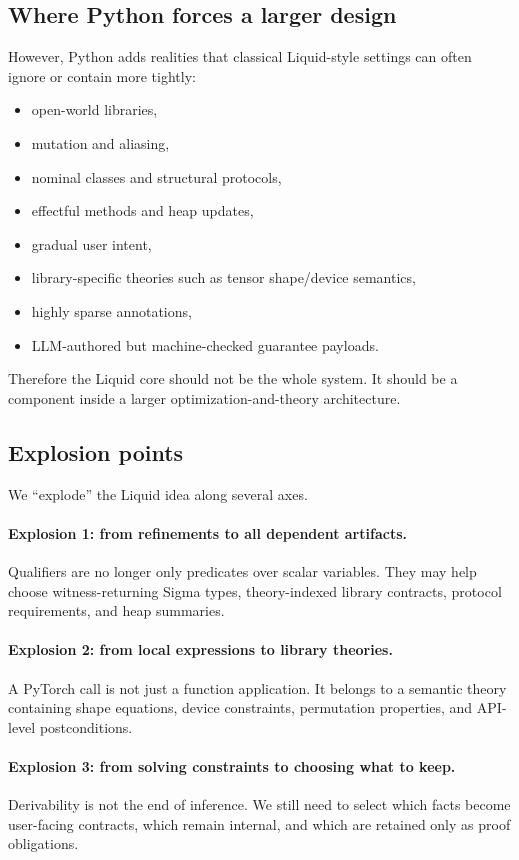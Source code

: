 \documentclass[11pt]{article}
\theoremstyle{definition}
\theoremstyle{plain}
\begin{document}
\subsection{Where Python forces a larger design}
However, Python adds realities that classical Liquid-style settings can often
ignore or contain more tightly:
\begin{itemize}
  \item open-world libraries,
  \item mutation and aliasing,
  \item nominal classes and structural protocols,
  \item effectful methods and heap updates,
  \item gradual user intent,
  \item library-specific theories such as tensor shape/device semantics,
  \item highly sparse annotations,
  \item LLM-authored but machine-checked guarantee payloads.
\end{itemize}
Therefore the Liquid core should not be the whole system. It should be a
component inside a larger optimization-and-theory architecture.

\subsection{Explosion points}
We ``explode'' the Liquid idea along several axes.

\paragraph{Explosion 1: from refinements to all dependent artifacts.}
Qualifiers are no longer only predicates over scalar variables. They may help
choose witness-returning Sigma types, theory-indexed library contracts,
protocol requirements, and heap summaries.

\paragraph{Explosion 2: from local expressions to library theories.}
A PyTorch call is not just a function application. It belongs to a semantic
theory containing shape equations, device constraints, permutation properties,
and API-level postconditions.

\paragraph{Explosion 3: from solving constraints to choosing what to keep.}
Derivability is not the end of inference. We still need to select which facts
become user-facing contracts, which remain internal, and which are retained only
as proof obligations.
\end{document}
